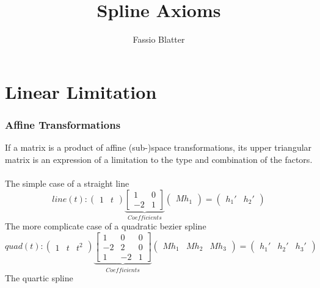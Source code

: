 \documentclass[a4paper,landscape]{report}
\begin{document}
\title{Spline Axioms}
\author{Fassio Blatter}
\maketitle

\chapter{Linear Limitation}

\subsection{Affine Transformations}
If a matrix is a product of affine (sub-)space transformations, its upper triangular matrix is an expression of a limitation to the type and combination of the factors.\\\\
The simple case of a straight line
\begin{equation}
line(t):
\begin{pmatrix}
1 & t
\end{pmatrix}
\underbrace{\begin{bmatrix}
1 & 0\\
-2 & 1
\end{bmatrix}}_{Coefficients}
\begin{pmatrix}
Mh_{1}
\end{pmatrix}
=
\begin{pmatrix}
h_{1}' & h_{2}'
\end{pmatrix}
\end{equation}
The more complicate case of a quadratic bezier spline
\begin{equation}
quad(t):
\begin{pmatrix}
1 & t & t^2
\end{pmatrix}
\underbrace{\begin{bmatrix}
1 & 0 & 0\\
-2 & 2 & 0\\
1 & -2 &1
\end{bmatrix}}_{Coefficients}
\begin{pmatrix}
Mh_{1} & Mh_{2} & Mh_{3}
\end{pmatrix}
=
\begin{pmatrix}
h_{1}' & h_{2}' & h_{3}'
\end{pmatrix}
\end{equation}
The quartic spline
\end{document}
